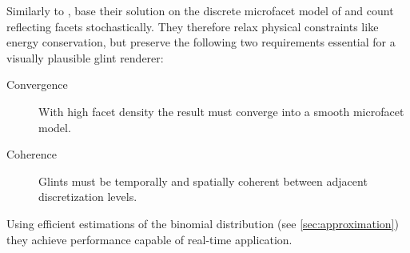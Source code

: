 Similarly to \textcite{zirr2016}, \textcite{deliot2023} base their solution on the discrete microfacet model of \textcite{jakob2014} and count reflecting facets stochastically.
% 
They therefore relax physical constraints like energy conservation, but preserve the following two requirements essential for a visually plausible glint renderer:
%
\begin{description}
    \item[Convergence\label{req:convergence}] With high facet density the result must converge into a smooth microfacet model.
    \item[Coherence\label{req:coherence}] Glints must be temporally and spatially coherent between adjacent discretization levels.
\end{description}

Using efficient estimations of the binomial distribution (see \cref{sec:approximation}) they achieve performance capable of real-time application.

